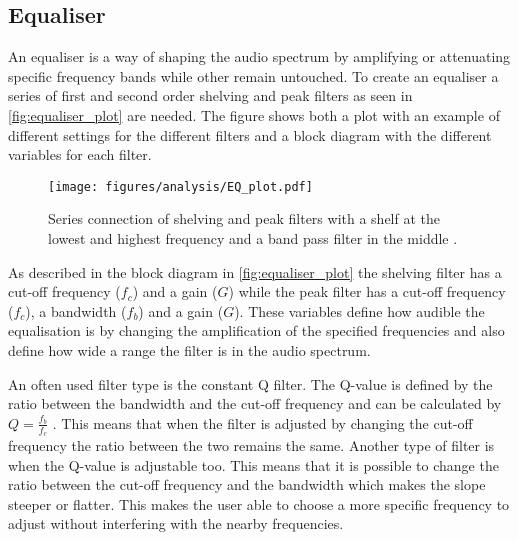 \subsection{Equaliser} \label{subs:equaliser_analysis}
An equaliser is a way of shaping the audio spectrum by amplifying or attenuating specific frequency bands while other remain untouched. To create an equaliser a series of first and second order shelving and peak filters as seen in \autoref{fig:equaliser_plot} are needed. The figure shows both a plot with an example of different settings for the different filters and a block diagram with the different variables for each filter. 

\begin{figure}[htbp]
	\centering
	\texttt{[image: figures/analysis/EQ\_plot.pdf]}
	\caption{Series connection of shelving and peak filters with a shelf at the lowest and highest frequency and a band pass filter in the middle \citep{DAFX}.} 
	\label{fig:equaliser_plot}
\end{figure}

As described in the block diagram in \autoref{fig:equaliser_plot} the shelving filter has a cut-off frequency ($f_c$) and a gain ($G$) while the peak filter has a cut-off frequency ($f_c$), a bandwidth ($f_b$) and a gain ($G$). These variables define how audible the equalisation is by changing the amplification of the specified frequencies and also define how wide a range the filter is in the audio spectrum. 

An often used filter type is the constant Q filter. The Q-value is defined by the ratio between the bandwidth and the cut-off frequency and can be calculated by $Q=\frac{f_b}{f_c}$ \citep{DAFX}. This means that when the filter is adjusted by changing the cut-off frequency the ratio between the two remains the same. Another type of filter is when the Q-value is adjustable too. This means that it is possible to change the ratio between the cut-off frequency and the bandwidth which makes the slope steeper or flatter. This makes the user able to choose a more specific frequency to adjust without interfering with the nearby frequencies. 

